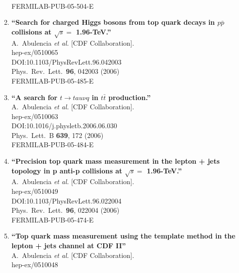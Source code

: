 \documentclass{article}
\begin{document}
\begin{enumerate}
  \\{}FERMILAB-PUB-05-504-E
\item%
{\bf ``Search for charged Higgs bosons from top quark decays in $p\bar{p}$ collisions at $\sqrt{s} =$ 1.96-TeV.''}
  \\{}A.~Abulencia {\it et al.} [CDF Collaboration].
  \\{}hep-ex/0510065
  \\{}DOI:10.1103/PhysRevLett.96.042003
  \\{}Phys.\ Rev.\ Lett.\  {\bf 96}, 042003 (2006)
  \\{}FERMILAB-PUB-05-485-E
\item%
{\bf ``A search for $t \to tau \nu q$ in $t\bar{t}$ production.''}
  \\{}A.~Abulencia {\it et al.} [CDF Collaboration].
  \\{}hep-ex/0510063
  \\{}DOI:10.1016/j.physletb.2006.06.030
  \\{}Phys.\ Lett.\ B {\bf 639}, 172 (2006)
  \\{}FERMILAB-PUB-05-484-E
\item%
{\bf ``Precision top quark mass measurement in the lepton + jets topology in p anti-p collisions at $\sqrt{s}=$ 1.96-TeV.''}
  \\{}A.~Abulencia {\it et al.} [CDF Collaboration].
  \\{}hep-ex/0510049
  \\{}DOI:10.1103/PhysRevLett.96.022004
  \\{}Phys.\ Rev.\ Lett.\  {\bf 96}, 022004 (2006)
  \\{}FERMILAB-PUB-05-474-E
\item%
{\bf ``Top quark mass measurement using the template method in the lepton + jets channel at CDF II''}
  \\{}A.~Abulencia {\it et al.} [CDF Collaboration].
  \\{}hep-ex/0510048

\end{enumerate}
\end{document}
